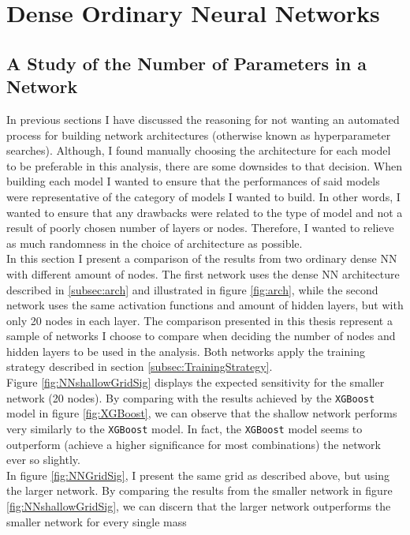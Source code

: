 \section{Dense Ordinary Neural Networks}
\subsection{A Study of the Number of Parameters in a Network}
In previous sections I have discussed the reasoning for not wanting an automated process for building network architectures (otherwise known
as hyperparameter searches). Although, I found manually choosing the architecture for each model to be preferable in this analysis, there 
are some downsides to that decision. When building each model I wanted to ensure that the performances of said models were representative of 
the category of models I wanted to build. In other words, I wanted to ensure that any drawbacks were related to the type of model and not 
a result of poorly chosen number of layers or nodes. Therefore, I wanted to relieve as much randomness in the choice of architecture as possible.
\\
In this section I present a comparison of the results from two ordinary dense \ac{NN} with different amount of nodes. The first network 
uses the dense \ac{NN} architecture described in \ref{subsec:arch} and illustrated in figure \ref{fig:arch}, while the second network uses the same activation 
functions and amount of hidden layers, but with only 20 nodes in each layer. The comparison presented in this thesis represent a sample of networks I choose to 
compare when deciding the number of nodes and hidden layers to be used in the analysis. Both networks apply the training strategy described in section \ref{subsec:TrainingStrategy}.
\\
Figure \ref{fig:NNshallowGridSig} displays the expected sensitivity for the smaller network (20 nodes). By comparing with the 
results achieved by the \verb!XGBoost! model in figure \ref{fig:XGBoost}, we can observe that the shallow network performs very similarly to the \verb!XGBoost! model. 
In fact, the \verb!XGBoost! model seems to outperform (achieve a higher significance for most combinations) the network ever so slightly.
\\
In figure \ref{fig:NNGridSig}, I present the same grid as described above, but using the larger network. By comparing the results from the smaller 
network in figure \ref{fig:NNshallowGridSig}, we can discern that the larger network outperforms the smaller network for every single mass 
